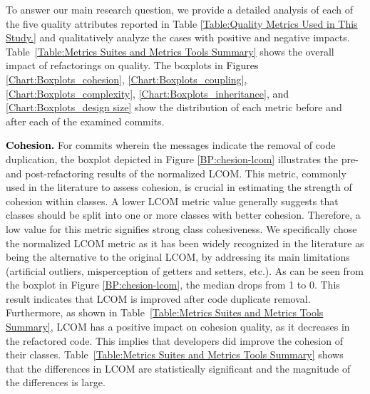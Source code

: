

To answer our main research question, we provide a detailed analysis of each of the five quality attributes reported in Table \ref{Table:Quality Metrics Used in This Study.} and qualitatively analyze the cases with positive and negative impacts. Table~\ref{Table:Metrics Suites and Metrics Tools Summary} shows the overall impact of refactorings on quality. The boxplots in \textcolor{black}{Figures \ref{Chart:Boxplots_cohesion}, \ref{Chart:Boxplots_coupling}, \ref{Chart:Boxplots_complexity}, \ref{Chart:Boxplots_inheritance}, and \ref{Chart:Boxplots_design size}} show the distribution of each metric before and after each of the examined commits.


\noindent\textbf{\textcolor{black}{Cohesion.}}  For commits wherein the messages indicate the removal of code duplication, the boxplot depicted in Figure \ref{BP:chesion-lcom} illustrates the pre- and post-refactoring results of the normalized LCOM. This metric, commonly used in the literature to assess cohesion, is crucial in estimating the strength of cohesion within classes. A lower LCOM metric value generally suggests that classes should be split into one or more classes with better cohesion. Therefore, a low value for this metric signifies strong class cohesiveness. We specifically chose the normalized LCOM metric as it has been widely recognized in the literature  \citep{pantiuchina2018improving,chavez2017does,henderson1995object} as being the alternative to the original LCOM, by addressing its main limitations (artificial outliers, misperception of getters and setters, etc.). As can be seen from the boxplot in Figure \ref{BP:chesion-lcom}, the median drops from 1 to 0. This result indicates that LCOM is improved after code duplicate removal. Furthermore, as shown in Table~\ref{Table:Metrics Suites and Metrics Tools Summary}, LCOM has a positive impact on cohesion quality, as it decreases in the refactored code. This implies that developers did improve the cohesion of their classes. Table~\ref{Table:Metrics Suites and Metrics Tools Summary} shows that the differences in LCOM are statistically significant and the magnitude of the differences is large.

